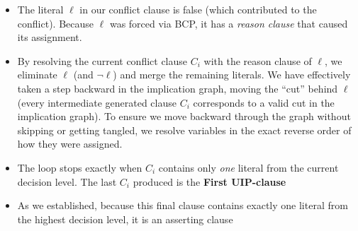 \documentclass[a4paper, 11pt]{report}
\begin{document}
\begin{itemize}

    \item The literal $\ell$ in our conflict clause is false (which contributed to the conflict). Because $\ell$ was forced via BCP, it has a \textit{reason clause} that caused its assignment.
    \item By resolving the current conflict clause $C_i$ with the reason clause of $\ell$, we eliminate $\ell$ (and $\neg \ell$) and merge the remaining literals. We have effectively taken a step backward in the implication graph, moving the ``cut'' behind $\ell$ (every intermediate generated clause $C_i$ corresponds to a valid cut in the implication graph). To ensure we move backward through the graph without skipping or getting tangled, we resolve variables in the exact reverse order of how they were assigned.
\item The loop stops exactly when $C_i$ contains only \textit{one} literal from the current decision level. The last $C_i$ produced is the \textbf{First UIP-clause}
    \item As we established, because this final clause contains exactly one literal from the highest decision level, it is an asserting clause
\end{itemize}
\end{document}
